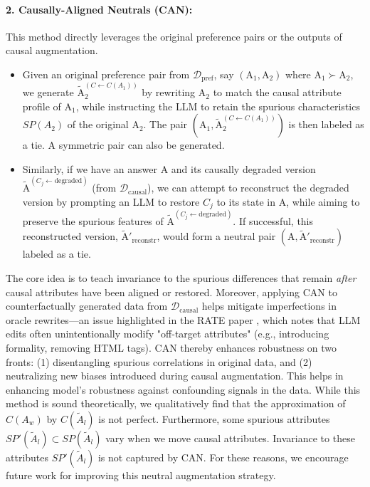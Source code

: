 \paragraph{2. Causally-Aligned Neutrals (CAN):}
This method directly leverages the original preference pairs or the outputs of causal augmentation.
\begin{itemize}[itemsep=0pt,left=8pt]
    \item Given an original preference pair from $\mathcal{D}_{\mathrm{pref}}$, say $(\mathrm{A}_1, \mathrm{A}_2)$ where $\mathrm{A}_1 \succ \mathrm{A}_2$, we generate $\tilde{\mathrm{A}}_{2}^{(C \leftarrow C(A_1))}$ by rewriting $\mathrm{A}_2$ to match the causal attribute profile of $\mathrm{A}_1$, while instructing the LLM to retain the spurious characteristics $SP(A_2)$ of the original $\mathrm{A}_2$. The pair $(\mathrm{A}_1, \tilde{\mathrm{A}}_{2}^{(C \leftarrow C(A_1))})$ is then labeled as a tie. A symmetric pair can also be generated.
    \item Similarly, if we have an answer $\mathrm{A}$ and its causally degraded version $\tilde{\mathrm{A}}^{(C_j \leftarrow \text{degraded})}$ (from $\mathcal{D}_{\mathrm{causal}}$), we can attempt to reconstruct the degraded version by prompting an LLM to restore $C_j$ to its state in $\mathrm{A}$, while aiming to preserve the spurious features of $\tilde{\mathrm{A}}^{(C_j \leftarrow \text{degraded})}$. If successful, this reconstructed version, $\tilde{\mathrm{A}}'_{\text{reconstr}}$, would form a neutral pair $(\mathrm{A}, \tilde{\mathrm{A}}'_{\text{reconstr}})$ labeled as a tie.
\end{itemize}
The core idea is to teach invariance to the spurious differences that remain \textit{after} causal attributes have been aligned or restored.
Moreover, applying CAN to counterfactually generated data from $\mathcal{D}_{\mathrm{causal}}$ helps mitigate imperfections in oracle rewrites—an issue highlighted in the RATE paper \citep{reber2024rate}, which notes that LLM edits often unintentionally modify "off-target attributes" (e.g., introducing formality, removing HTML tags). CAN thereby enhances robustness on two fronts: (1) disentangling spurious correlations in original data, and (2)  neutralizing new biases introduced during causal augmentation.
This helps in enhancing model's robustness against confounding signals in the data. While this method is sound theoretically, we qualitatively find that the approximation of $C(A_w)$ by $C(\tilde{A}_l)$ is not perfect. Furthermore, some spurious attributes $SP'(\tilde{A}_l) \subset SP(\tilde{A}_l)$ vary when we move causal attributes. Invariance to these attributes $SP'(\tilde{A}_l)$ is not captured by CAN. For these reasons, we encourage future work for improving this neutral augmentation strategy.
